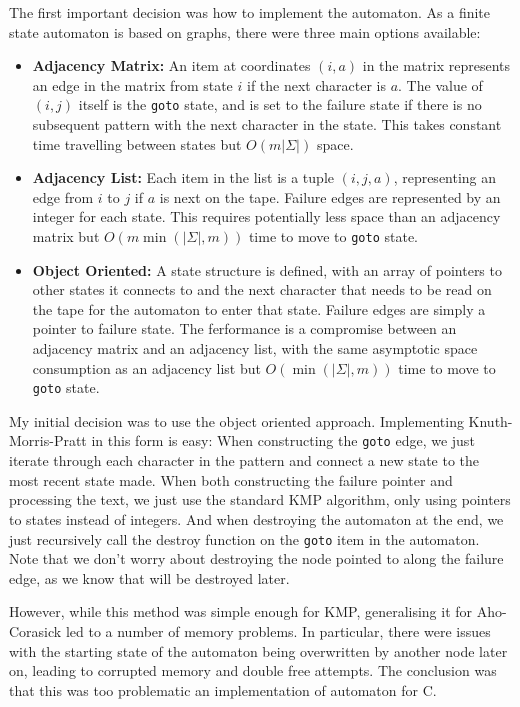 \documentclass[ %
                    author={Dominic Joseph Moylett},
                    degree={MEng},
                     title={Dictionary Matching with Fingerprints},
                  subtitle={An Empirical Analysis},
                      type={research},
                      year={2015} ]{dissertation}
\begin{document}
The first important decision was how to implement the automaton. As a finite state automaton is based on graphs, there were three main options available:

\begin{itemize}
  \item \textbf{Adjacency Matrix:} An item at coordinates $(i,a)$ in the matrix represents an edge in the matrix from state $i$ if the next character is $a$. The value of $(i,j)$ itself is the \texttt{goto} state, and is set to the failure state if there is no subsequent pattern with the next character in the state. This takes constant time travelling between states but $O(m|\Sigma|)$ space.
  \item \textbf{Adjacency List:} Each item in the list is a tuple $(i, j, a)$, representing an edge from $i$ to $j$ if $a$ is next on the tape. Failure edges are represented by an integer for each state. This requires potentially less space than an adjacency matrix but $O(m \min(|\Sigma|, m))$ time to move to \texttt{goto} state.
  \item \textbf{Object Oriented:} A state structure is defined, with an array of pointers to other states it connects to and the next character that needs to be read on the tape for the automaton to enter that state. Failure edges are simply a pointer to failure state. The ferformance is a compromise between an adjacency matrix and an adjacency list, with the same asymptotic space consumption as an adjacency list but $O(\min(|\Sigma|, m))$ time to move to \texttt{goto} state.
\end{itemize}

My initial decision was to use the object oriented approach. Implementing Knuth-Morris-Pratt in this form is easy: When constructing the \texttt{goto} edge, we just iterate through each character in the pattern and connect a new state to the most recent state made. When both constructing the failure pointer and processing the text, we just use the standard KMP algorithm, only using pointers to states instead of integers. And when destroying the automaton at the end, we just recursively call the destroy function on the \texttt{goto} item in the automaton. Note that we don't worry about destroying the node pointed to along the failure edge, as we know that will be destroyed later.

However, while this method was simple enough for KMP, generalising it for Aho-Corasick led to a number of memory problems. In particular, there were issues with the starting state of the automaton being overwritten by another node later on, leading to corrupted memory and double free attempts. The conclusion was that this was too problematic an implementation of automaton for C.
\end{document}
